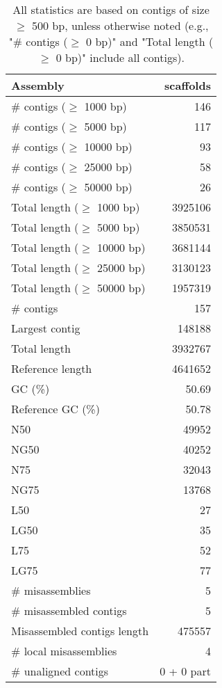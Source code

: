 \documentclass[12pt,a4paper]{article}
\begin{document}
\begin{table}[ht]
\begin{center}
\caption{All statistics are based on contigs of size $\geq$ 500 bp, unless otherwise noted (e.g., "\# contigs ($\geq$ 0 bp)" and "Total length ($\geq$ 0 bp)" include all contigs).}
\begin{tabular}{|l*{1}{|r}|}
\hline
Assembly & scaffolds \\ \hline
\# contigs ($\geq$ 1000 bp) & 146 \\ \hline
\# contigs ($\geq$ 5000 bp) & 117 \\ \hline
\# contigs ($\geq$ 10000 bp) & 93 \\ \hline
\# contigs ($\geq$ 25000 bp) & 58 \\ \hline
\# contigs ($\geq$ 50000 bp) & 26 \\ \hline
Total length ($\geq$ 1000 bp) & 3925106 \\ \hline
Total length ($\geq$ 5000 bp) & 3850531 \\ \hline
Total length ($\geq$ 10000 bp) & 3681144 \\ \hline
Total length ($\geq$ 25000 bp) & 3130123 \\ \hline
Total length ($\geq$ 50000 bp) & 1957319 \\ \hline
\# contigs & 157 \\ \hline
Largest contig & 148188 \\ \hline
Total length & 3932767 \\ \hline
Reference length & 4641652 \\ \hline
GC (\%) & 50.69 \\ \hline
Reference GC (\%) & 50.78 \\ \hline
N50 & 49952 \\ \hline
NG50 & 40252 \\ \hline
N75 & 32043 \\ \hline
NG75 & 13768 \\ \hline
L50 & 27 \\ \hline
LG50 & 35 \\ \hline
L75 & 52 \\ \hline
LG75 & 77 \\ \hline
\# misassemblies & 5 \\ \hline
\# misassembled contigs & 5 \\ \hline
Misassembled contigs length & 475557 \\ \hline
\# local misassemblies & 4 \\ \hline
\# unaligned contigs & 0 + 0 part \\ \hline

\end{tabular}
\end{center}
\end{table}
\end{document}
